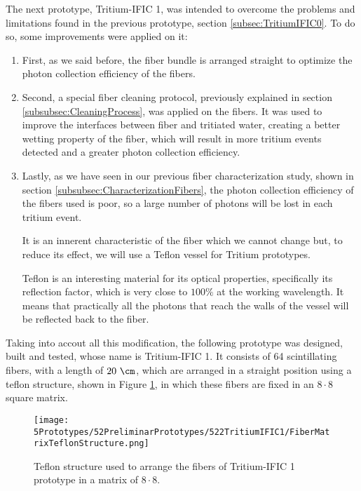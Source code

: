 The next prototype, Tritium-IFIC 1, was intended to overcome the problems and limitations found in the previous prototype, section \ref{subsec:TritiumIFIC0}. To do so, some improvements were applied on it:

\begin{enumerate}

\item{} First, as we said before, the fiber bundle is arranged straight to optimize the photon collection efficiency of the fibers.

\item{} Second, a special fiber cleaning protocol, previously explained in section \ref{subsubsec:CleaningProcess}, was applied on the fibers. It was used to improve the interfaces between fiber and tritiated water, creating a better wetting property of the fiber, which will result in more tritium events detected and a greater photon collection efficiency.

\item{} Lastly, as we have seen in our previous fiber characterization study, shown in section \ref{subsubsec:CharacterizationFibers}, the photon collection efficiency of the fibers used is poor, so a large number of photons will be lost in each tritium event.

It is an innerent characteristic of the fiber which we cannot change but, to reduce its effect, we will use a Teflon vessel for Tritium prototypes.

Teflon is an interesting material for its optical properties, specifically its reflection factor, which is very close to $100\%$ at the working wavelength. It means that practically all the photons that reach the walls of the vessel will be reflected back to the fiber.

\end{enumerate}

Taking into accout all this modification, the following prototype was designed, built and tested, whose name is Tritium-IFIC 1. It consists of 64 scintillating fibers, with a length of $20~\cm$, which are arranged in a straight position using a teflon structure, shown in Figure \ref{fig:TeflonStructureFibersTritiumIFIC1}, in which these fibers are fixed in an $8\cdot{}8$ square matrix.

\begin{figure}[h]
\centering
\texttt{[image: 5Prototypes/52PreliminarPrototypes/522TritiumIFIC1/FiberMatrixTeflonStructure.png]}
\caption{Teflon structure used to arrange the fibers of Tritium-IFIC 1 prototype in a matrix of $8\cdot{}8$.\label{fig:TeflonStructureFibersTritiumIFIC1}}
\end{figure}

